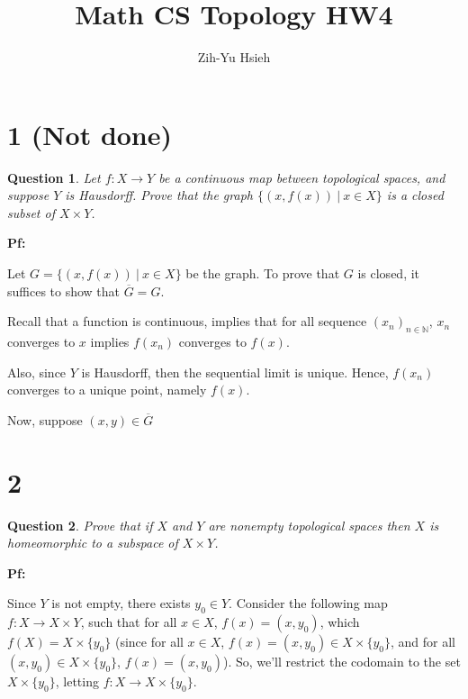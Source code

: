 \documentclass{article}
\title{Math CS Topology HW4}
\author{Zih-Yu Hsieh}
\newtheorem{question}{Question}
\begin{document}
\maketitle

\section*{1 (Not done)}
\begin{myBox}[]{}
    \begin{question}
        Let $f:X\rightarrow Y$ be a continuous map between topological spaces, and suppose
        $Y$ is Hausdorff. Prove that the graph $\{(x,f(x))\ |\ x\in X\}$ is a closed subset of
        $X\times Y$.
    \end{question}
\end{myBox}

\textbf{Pf:}

Let $G=\{(x,f(x))\ |\ x\in X\}$ be the graph. To prove that $G$ is closed, it suffices to show that $\overline{G}=G$.

\hfill

Recall that a function is continuous, implies that for all sequence $(x_n)_{n\in\mathbb{N}}$, $x_n$ converges to $x$ implies $f(x_n)$ converges to $f(x)$.

Also, since $Y$ is Hausdorff, then the sequential limit is unique. Hence, $f(x_n)$ converges to a unique point, namely $f(x)$.

\hfill

Now, suppose $(x,y)\in \overline{G}$

\break

\section*{2}
\begin{myBox}[]{}
    \begin{question}
        Prove that if $X$ and $Y$ are nonempty topological spaces then 
        $X$ is homeomorphic to a subspace of $X\times Y$.
    \end{question}
\end{myBox}

\textbf{Pf:}

Since $Y$ is not empty, there exists $y_0\in Y$. Consider the following map $f:X\rightarrow X\times Y$, such that for all $x\in X$,
$f(x)=(x,y_0)$, which $f(X)=X\times \{y_0\}$ (since for all $x\in X$, $f(x)=(x,y_0)\in X\times \{y_0\}$, and for all $(x,y_0)\in X\times \{y_0\}$, $f(x)=(x,y_0)$).
So, we'll restrict the codomain to the set $X\times \{y_0\}$, letting $f:X\rightarrow X\times \{y_0\}$.
\end{document}
